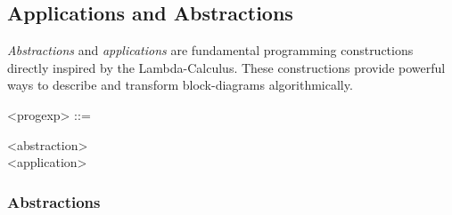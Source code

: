 \documentclass[a4paper]{book}
\begin{document}
%  









\subsection{Applications and Abstractions}

\textit{Abstractions} and \textit{applications} are fundamental programming constructions directly inspired by the Lambda-Calculus. These constructions provide powerful ways to describe and transform block-diagrams algorithmically.

\begin{grammar}
  <progexp> ::= 
  \begin{syntdiag}
    \begin{stack}
      <abstraction> \\ <application>
    \end{stack}
  \end{syntdiag}
\end{grammar}

\subsubsection{Abstractions}
\end{document}
